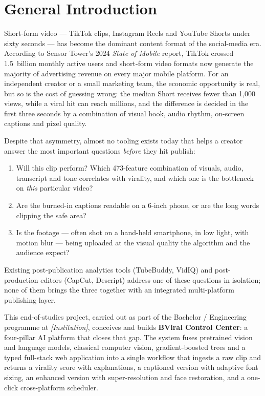 \chapter*{General Introduction}

Short-form video --- TikTok clips, Instagram Reels and YouTube Shorts under sixty seconds ---
has become the dominant content format of the social-media era. According to Sensor Tower's
2024 \textit{State of Mobile} report, TikTok crossed 1.5~billion monthly active users and
short-form video formats now generate the majority of advertising revenue on every major
mobile platform. For an independent creator or a small marketing team, the economic
opportunity is real, but so is the cost of guessing wrong: the median Short receives fewer than
1{,}000 views, while a viral hit can reach millions, and the difference is decided in the first
three seconds by a combination of visual hook, audio rhythm, on-screen captions and pixel
quality.

Despite that asymmetry, almost no tooling exists today that helps a creator answer the most
important questions \emph{before} they hit publish:

\begin{enumerate}
  \item Will this clip perform? Which 473-feature combination of visuals, audio, transcript
        and tone correlates with virality, and which one is the bottleneck on \emph{this}
        particular video?
  \item Are the burned-in captions readable on a 6-inch phone, or are the long words clipping
        the safe area?
  \item Is the footage --- often shot on a hand-held smartphone, in low light, with motion blur ---
        being uploaded at the visual quality the algorithm and the audience expect?
\end{enumerate}

Existing post-publication analytics tools (TubeBuddy, VidIQ) and post-production editors
(CapCut, Descript) address one of these questions in isolation; none of them brings the three
together with an integrated multi-platform publishing layer.

This end-of-studies project, carried out as part of the Bachelor / Engineering programme at
\textit{[Institution]}, conceives and builds \textbf{BViral Control Center}: a four-pillar AI
platform that closes that gap. The system fuses pretrained vision and language models, classical
computer vision, gradient-boosted trees and a typed full-stack web application into a single
workflow that ingests a raw clip and returns a virality score with explanations, a captioned
version with adaptive font sizing, an enhanced version with super-resolution and face
restoration, and a one-click cross-platform scheduler.

